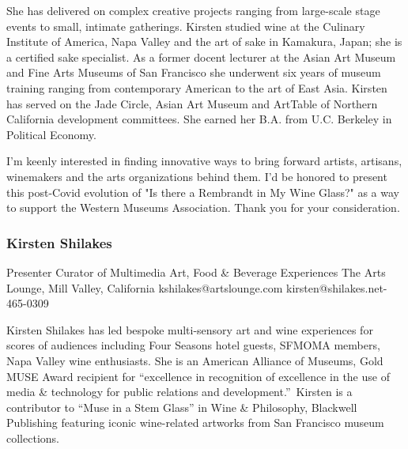\documentclass{report}
\begin{document}
She has delivered on complex creative projects ranging from large-scale stage events to small, intimate gatherings. Kirsten studied wine at the Culinary Institute of America, Napa Valley and the art of sake in Kamakura, Japan; she is a certified sake specialist. As a former docent lecturer at the Asian Art Museum and Fine Arts Museums of San Francisco she underwent six years of museum training ranging from contemporary American to the art of East Asia. Kirsten has served on the Jade Circle, Asian Art Museum and ArtTable of Northern California development committees. She earned her B.A. from U.C. Berkeley in Political Economy.

I’m keenly interested in finding innovative ways to bring forward artists, artisans, winemakers and the arts organizations behind them. I’d be honored to present this post-Covid evolution of "Is there a Rembrandt in My Wine Glass?" as a way to support the Western Museums Association. Thank you for your consideration.\newline


              

              
                \subsubsection*{ Kirsten  Shilakes }
                Presenter\newline
                Curator of Multimedia Art, Food \& Beverage Experiences\newline
                The Arts Lounge, Mill Valley, California
                \newline
                kshilakes@artslounge.com\newline
                kirsten@shilakes.net-465-0309\newline

                Kirsten Shilakes has led bespoke multi-sensory art and wine experiences for scores of audiences including Four Seasons hotel guests, SFMOMA members, Napa Valley wine enthusiasts. She is an American Alliance of Museums, Gold MUSE Award recipient for “excellence in recognition of excellence in the use of media \& technology for public relations and development.” Kirsten is a contributor to “Muse in a Stem Glass” in Wine \& Philosophy, Blackwell Publishing featuring iconic wine-related artworks from San Francisco museum collections.
\end{document}
